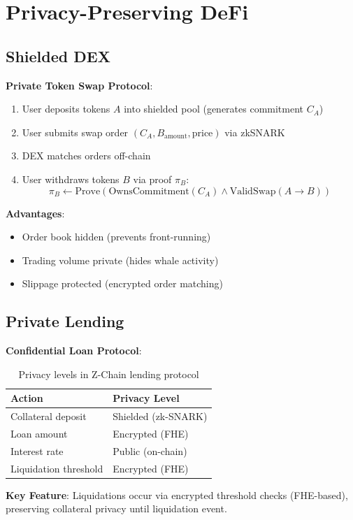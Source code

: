 \section{Privacy-Preserving DeFi}


\subsection{Shielded DEX}

\textbf{Private Token Swap Protocol}:

\begin{enumerate}
  \item User deposits tokens $A$ into shielded pool (generates commitment $C_A$)
  \item User submits swap order $(C_A, B_{\text{amount}}, \text{price})$ via zkSNARK
  \item DEX matches orders off-chain
  \item User withdraws tokens $B$ via proof $\pi_B$:
  \begin{equation}
    \pi_B \leftarrow \text{Prove}\left(\text{OwnsCommitment}(C_A) \land \text{ValidSwap}(A \to B)\right)
  \end{equation}
\end{enumerate}

\textbf{Advantages}:
\begin{itemize}[leftmargin=1.1em]
  \item Order book hidden (prevents front-running)
  \item Trading volume private (hides whale activity)
  \item Slippage protected (encrypted order matching)
\end{itemize}

\subsection{Private Lending}

\textbf{Confidential Loan Protocol}:

\begin{table}[h]
\centering
\begin{tabular}{ll}
\toprule
Action & Privacy Level \\
\midrule
Collateral deposit & Shielded (zk-SNARK) \\
Loan amount & Encrypted (FHE) \\
Interest rate & Public (on-chain) \\
Liquidation threshold & Encrypted (FHE) \\
\bottomrule
\end{tabular}
\caption{Privacy levels in Z-Chain lending protocol}
\end{table}

\textbf{Key Feature}: Liquidations occur via encrypted threshold checks (FHE-based), preserving collateral privacy until liquidation event.

